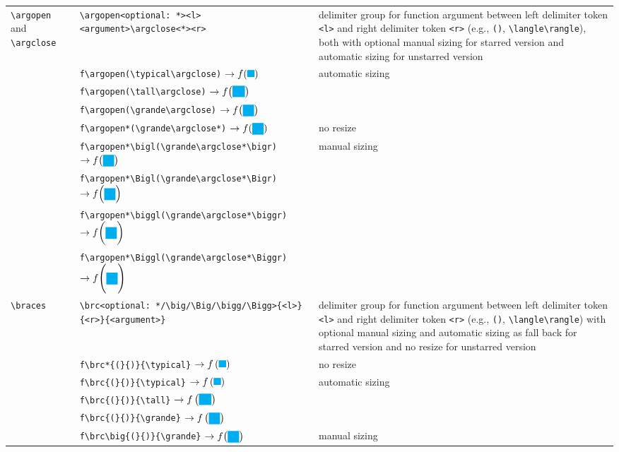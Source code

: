 \documentclass[a4paper,12pt]{article}
\begin{document}
{\fontsize{8pt}{12pt}\selectfont
\begin{longtable}[c]{|L{0.3\textwidth}|L{0.3\textwidth}|L{0.3\textwidth}|}
\hline
\verb|\argopen| and \verb|\argclose| & \verb|\argopen<optional: *><l><argument>\argclose<*><r>| & delimiter group for function argument between left delimiter token \verb|<l>| and right delimiter token \verb|<r>| (e.g., \verb|()|, \verb|\langle\rangle|), both with optional manual sizing for starred version and automatic sizing for unstarred version \\
& \verb|f\argopen(\typical\argclose)| $\rightarrow f\argopen(\typical\argclose)$ & automatic sizing \\
& \verb|f\argopen(\tall\argclose)| $\rightarrow f\argopen(\tall\argclose)$ & \\
& \verb|f\argopen(\grande\argclose)| $\rightarrow f\argopen(\grande\argclose)$ & \\
& \verb|f\argopen*(\grande\argclose*)| $\rightarrow f\argopen*(\grande\argclose*)$ & no resize \\
& \verb|f\argopen*\bigl(\grande\argclose*\bigr)| $\rightarrow f\argopen*\bigl(\grande\argclose*\bigr)$ & manual sizing \\
& \verb|f\argopen*\Bigl(\grande\argclose*\Bigr)| $\rightarrow f\argopen*\Bigl(\grande\argclose*\Bigr)$ & \\
& \verb|f\argopen*\biggl(\grande\argclose*\biggr)| $\rightarrow f\argopen*\biggl(\grande\argclose*\biggr)$ & \\
& \verb|f\argopen*\Biggl(\grande\argclose*\Biggr)| $\rightarrow f\argopen*\Biggl(\grande\argclose*\Biggr)$ & \\\hline
\verb|\braces| & \verb|\brc<optional: */\big/\Big/\bigg/\Bigg>{<l>}{<r>}{<argument>}| & delimiter group for function argument between left delimiter token \verb|<l>| and right delimiter token \verb|<r>| (e.g., \verb|()|, \verb|\langle\rangle|) with optional manual sizing and automatic sizing as fall back for starred version and no resize for unstarred version \\
& \verb|f\brc*{(}{)}{\typical}| $\rightarrow f\brc*{(}{)}{\typical}$ & no resize \\
& \verb|f\brc{(}{)}{\typical}| $\rightarrow f\brc{(}{)}{\typical}$ & automatic sizing \\
& \verb|f\brc{(}{)}{\tall}| $\rightarrow f\brc{(}{)}{\tall}$ & \\
& \verb|f\brc{(}{)}{\grande}| $\rightarrow f\brc{(}{)}{\grande}$ & \\
& \verb|f\brc\big{(}{)}{\grande}| $\rightarrow f\brc\big{(}{)}{\grande}$ & manual sizing \\

\end{longtable}}
\end{document}
